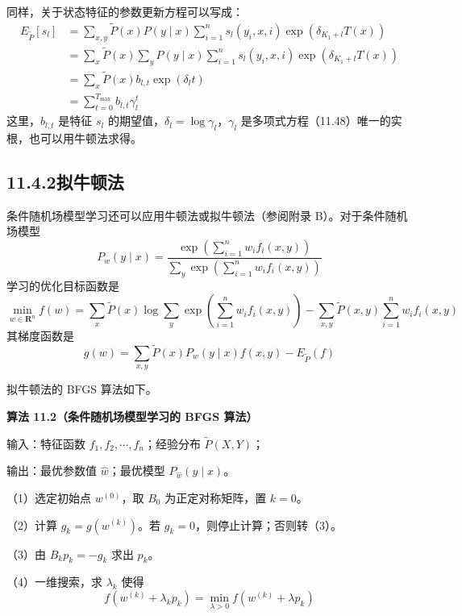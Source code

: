 \documentclass[UTF8,12pt,a4paper,fontset=fandol]{ctexart}
\begin{document}
同样，关于状态特征的参数更新方程可以写成：
\begin{equation}
\begin{aligned}
E_{\tilde P}[s_l]
&=\sum_{x,y}\tilde P(x)P(y\mid x)\sum_{i=1}^{n}s_l(y_i,x,i)\exp(\delta_{K_1+l}T(x))\\
&=\sum_x\tilde P(x)\sum_yP(y\mid x)\sum_{i=1}^{n}s_l(y_i,x,i)\exp(\delta_{K_1+l}T(x))\\
&=\sum_x\tilde P(x)b_{l,t}\exp(\delta_lt)\\
&=\sum_{t=0}^{T_{\max}}b_{l,t}\gamma_l^t
\end{aligned}
\tag{11.48}
\end{equation}
这里，$b_{l,t}$ 是特征 $s_l$ 的期望值，$\delta_l=\log\gamma_l$，$\gamma_l$ 是多项式方程（11.48）唯一的实根，也可以用牛顿法求得。

\subsection*{11.4.2\quad 拟牛顿法}

条件随机场模型学习还可以应用牛顿法或拟牛顿法（参阅附录 B）。对于条件随机场模型
\begin{equation}
P_w(y\mid x)=
\frac{
\exp\left(\sum_{i=1}^{n}w_if_i(x,y)\right)
}{
\sum_y\exp\left(\sum_{i=1}^{n}w_if_i(x,y)\right)
}
\tag{11.49}
\end{equation}
学习的优化目标函数是
\begin{equation}
\min_{w\in\mathbf R^n}f(w)=
\sum_x\tilde P(x)\log\sum_y\exp\left(\sum_{i=1}^{n}w_if_i(x,y)\right)
-\sum_{x,y}\tilde P(x,y)\sum_{i=1}^{n}w_if_i(x,y)
\tag{11.50}
\end{equation}
其梯度函数是
\begin{equation}
g(w)=\sum_{x,y}\tilde P(x)P_w(y\mid x)f(x,y)-E_{\tilde P}(f)
\tag{11.51}
\end{equation}

拟牛顿法的 BFGS 算法如下。

\noindent\textbf{算法 11.2（条件随机场模型学习的 BFGS 算法）}

输入：特征函数 $f_1,f_2,\cdots,f_n$；经验分布 $\tilde P(X,Y)$；

输出：最优参数值 $\hat w$；最优模型 $P_{\hat w}(y\mid x)$。

（1）选定初始点 $w^{(0)}$，取 $B_0$ 为正定对称矩阵，置 $k=0$。

（2）计算 $g_k=g(w^{(k)})$。若 $g_k=0$，则停止计算；否则转（3）。

（3）由 $B_kp_k=-g_k$ 求出 $p_k$。

（4）一维搜索，求 $\lambda_k$ 使得
\[
f(w^{(k)}+\lambda_kp_k)=\min_{\lambda>0}f(w^{(k)}+\lambda p_k)
\]
\end{document}

